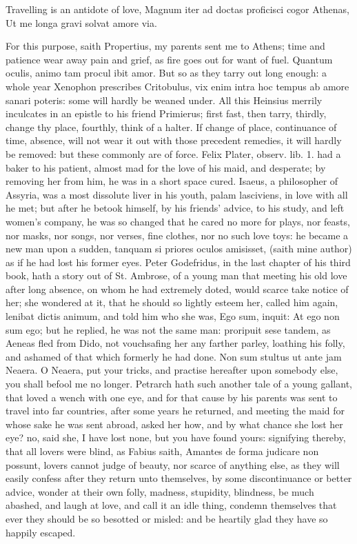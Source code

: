 {Travelling is an antidote of love,
Magnum iter ad doctas proficisci cogor Athenas,
Ut me longa gravi solvat amore via.

For this purpose, saith Propertius, my parents sent me to Athens;
time and patience wear away pain and grief, as fire goes out for want
of fuel. Quantum oculis, animo tam procul ibit amor. But so as they
tarry out long enough: a whole year Xenophon prescribes
Critobulus, vix enim intra hoc tempus ab amore sanari poteris: some
will hardly be weaned under. All this Heinsius merrily inculcates
in an epistle to his friend Primierus; first fast, then tarry, thirdly,
change thy place, fourthly, think of a halter. If change of place,
continuance of time, absence, will not wear it out with those precedent
remedies, it will hardly be removed: but these commonly are of force.
Felix Plater, observ. lib. 1. had a baker to his patient, almost mad
for the love of his maid, and desperate; by removing her from him, he
was in a short space cured. Isaeus, a philosopher of Assyria, was a
most dissolute liver in his youth, palam lasciviens, in love with all
he met; but after he betook himself, by his friends' advice, to his
study, and left women's company, he was so changed that he cared no
more for plays, nor feasts, nor masks, nor songs, nor verses, fine
clothes, nor no such love toys: he became a new man upon a sudden,
tanquam si priores oculos amisisset, (saith mine author) as if he
had lost his former eyes. Peter Godefridus, in the last chapter of his
third book, hath a story out of St. Ambrose, of a young man that
meeting his old love after long absence, on whom he had extremely
doted, would scarce take notice of her; she wondered at it, that he
should so lightly esteem her, called him again, lenibat dictis animum,
and told him who she was, Ego sum, inquit: At ego non sum ego; but he
replied, he was not the same man: proripuit sese tandem, as
Aeneas fled from Dido, not vouchsafing her any farther parley,
loathing his folly, and ashamed of that which formerly he had done.
Non sum stultus ut ante jam Neaera. O Neaera, put your tricks,
and practise hereafter upon somebody else, you shall befool me no
longer. Petrarch hath such another tale of a young gallant, that loved
a wench with one eye, and for that cause by his parents was sent to
travel into far countries, after some years he returned, and meeting
the maid for whose sake he was sent abroad, asked her how, and by what
chance she lost her eye? no, said she, I have lost none, but you have
found yours: signifying thereby, that all lovers were blind, as Fabius
saith, Amantes de forma judicare non possunt, lovers cannot judge of
beauty, nor scarce of anything else, as they will easily confess after
they return unto themselves, by some discontinuance or better advice,
wonder at their own folly, madness, stupidity, blindness, be much
abashed, and laugh at love, and call it an idle thing, condemn
themselves that ever they should be so besotted or misled: and be
heartily glad they have so happily escaped.

}
